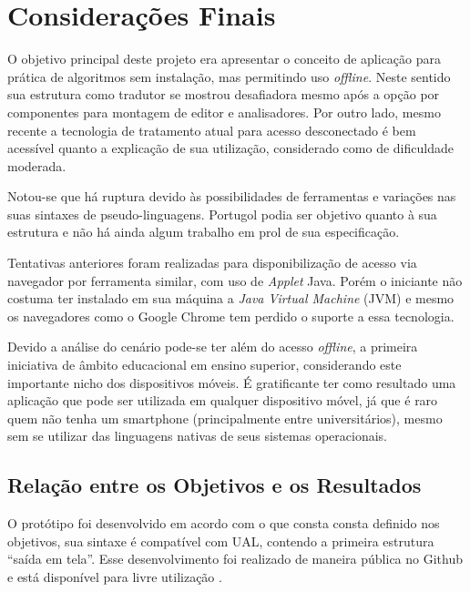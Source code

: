 
\chapter{Considerações Finais}

O objetivo principal deste projeto era apresentar o conceito de aplicação para prática de algoritmos sem instalação, mas permitindo uso \textit{offline}. Neste sentido sua estrutura como tradutor se mostrou desafiadora mesmo após a opção por componentes para montagem de editor e analisadores. Por outro lado, mesmo recente a tecnologia de tratamento atual para acesso desconectado é bem acessível quanto a explicação de sua utilização, considerado como de dificuldade moderada.

Notou-se que há ruptura devido às possibilidades de ferramentas e variações nas suas sintaxes de pseudo-linguagens. Portugol podia ser objetivo quanto à sua estrutura e não há ainda algum trabalho em prol de sua especificação.

Tentativas anteriores foram realizadas para disponibilização de acesso via navegador por ferramenta similar, com uso de \textit{Applet} Java. Porém o iniciante não costuma ter instalado em sua máquina a \textit{Java Virtual Machine} (JVM) e mesmo os navegadores como o Google Chrome tem perdido o suporte a essa tecnologia.

Devido a análise do cenário pode-se ter além do acesso \textit{offline}, a primeira iniciativa de âmbito educacional em ensino superior, considerando este importante nicho dos dispositivos móveis. É gratificante ter como resultado uma aplicação que pode ser utilizada em qualquer dispositivo móvel, já que é raro quem não tenha um smartphone (principalmente entre universitários), mesmo sem se utilizar das linguagens nativas de seus sistemas operacionais.

\section{Relação entre os Objetivos e os Resultados}

O protótipo foi desenvolvido em acordo com o que consta consta definido nos objetivos, sua sintaxe é compatível com UAL, contendo a primeira estrutura ``saída em tela''. Esse desenvolvimento foi realizado de maneira pública no Github e está disponível para livre utilização \cite{bizual}.


